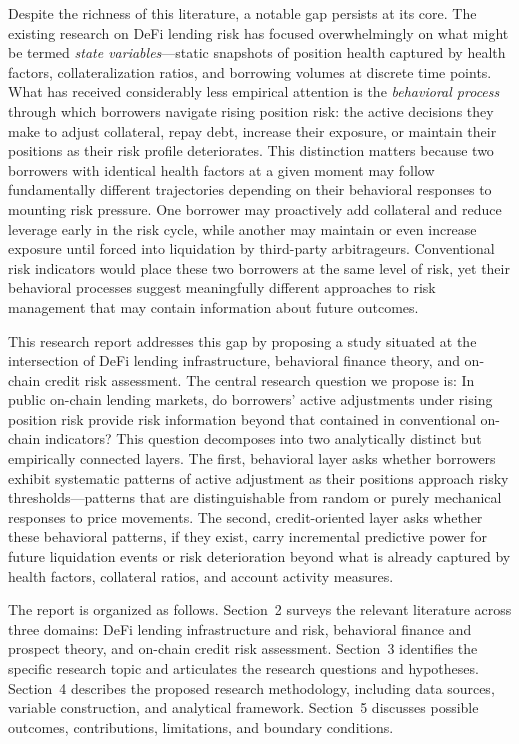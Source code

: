 Despite the richness of this literature, a notable gap persists at its core. The existing research on DeFi lending risk has focused overwhelmingly on what might be termed \emph{state variables}—static snapshots of position health captured by health factors, collateralization ratios, and borrowing volumes at discrete time points. What has received considerably less empirical attention is the \emph{behavioral process} through which borrowers navigate rising position risk: the active decisions they make to adjust collateral, repay debt, increase their exposure, or maintain their positions as their risk profile deteriorates. This distinction matters because two borrowers with identical health factors at a given moment may follow fundamentally different trajectories depending on their behavioral responses to mounting risk pressure. One borrower may proactively add collateral and reduce leverage early in the risk cycle, while another may maintain or even increase exposure until forced into liquidation by third-party arbitrageurs. Conventional risk indicators would place these two borrowers at the same level of risk, yet their behavioral processes suggest meaningfully different approaches to risk management that may contain information about future outcomes.

This research report addresses this gap by proposing a study situated at the intersection of DeFi lending infrastructure, behavioral finance theory, and on-chain credit risk assessment. The central research question we propose is: In public on-chain lending markets, do borrowers' active adjustments under rising position risk provide risk information beyond that contained in conventional on-chain indicators? This question decomposes into two analytically distinct but empirically connected layers. The first, behavioral layer asks whether borrowers exhibit systematic patterns of active adjustment as their positions approach risky thresholds—patterns that are distinguishable from random or purely mechanical responses to price movements. The second, credit-oriented layer asks whether these behavioral patterns, if they exist, carry incremental predictive power for future liquidation events or risk deterioration beyond what is already captured by health factors, collateral ratios, and account activity measures.


\vspace{4pt}

The report is organized as follows. Section~2 surveys the relevant literature across three domains: DeFi lending infrastructure and risk, behavioral finance and prospect theory, and on-chain credit risk assessment. Section~3 identifies the specific research topic and articulates the research questions and hypotheses. Section~4 describes the proposed research methodology, including data sources, variable construction, and analytical framework. Section~5 discusses possible outcomes, contributions, limitations, and boundary conditions.
